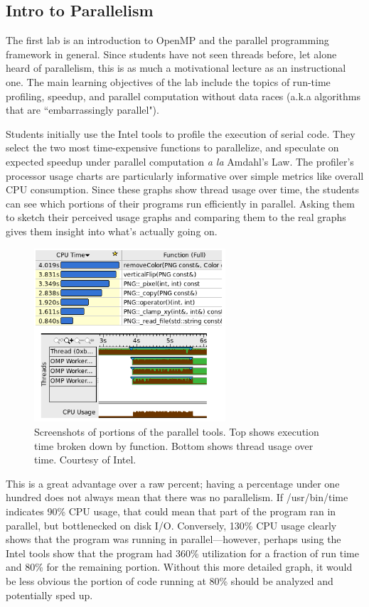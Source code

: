 \documentclass[conference]{./IEEEtran}
\begin{document}
\subsection{Intro to Parallelism}

The first lab is an introduction to OpenMP and the parallel programming
framework in general.  Since students have not seen threads before, let alone
heard of parallelism, this is as much a motivational lecture as an instructional
one.  The main learning objectives of the lab include the topics of run-time
profiling, speedup, and parallel computation without data races (a.k.a
algorithms that are ``embarrassingly parallel").

Students initially use the Intel tools to profile the execution of serial code.
They  select the two most time-expensive functions to parallelize, and speculate
on expected speedup under parallel computation \emph{a la} Amdahl's Law. The
profiler's processor usage charts are particularly informative over simple
metrics like overall CPU consumption. Since these graphs show thread usage over
time, the students can see which portions of their programs run efficiently in
parallel. Asking them to sketch their perceived usage graphs and comparing them
to the real graphs gives them insight into what's actually going on.

\begin{figure}[here]
\label{fig:tool}
\begin{center}
\includegraphics[width=2.8in]{tool-small.png}
\caption{Screenshots of portions of the parallel tools. Top shows execution time
broken down by function. Bottom shows thread usage over time. Courtesy of Intel.}
\end{center}
\end{figure}

This is a great advantage over a raw percent; having a percentage under one
hundred does not always mean that there was no parallelism.  If /usr/bin/time
indicates 90\% CPU usage, that could mean that part of the program ran in
parallel, but bottlenecked on disk I/O.  Conversely, 130\% CPU usage clearly
shows that the program was running in parallel---however, perhaps using the
Intel tools show that the program had 360\% utilization for a fraction of run
time and 80\% for the remaining portion.  Without this more detailed graph, it
would be less obvious the portion of code running at 80\% should be analyzed and
potentially sped up.
\end{document}

